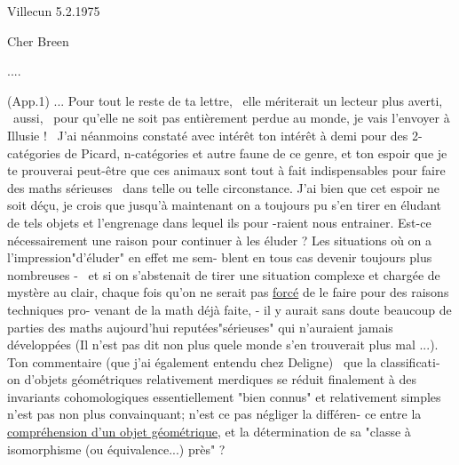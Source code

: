 
\hfill Villecun 5.2.1975

\margin{--} Cher Breen

\quad ....

(App.1) \quad ... Pour tout le reste de ta lettre, \ elle mériterait un lecteur
\margin{--} plus averti, \ aussi, \ pour qu'elle ne soit pas entièrement perdue au monde,
je vais l'envoyer à Illusie ! \ J'ai néanmoins
constaté\hand{,} avec intérêt\hand{,} ton intérêt à demi  pour des 2-catégories de
Picard, n-catégories et autre faune de ce genre, et ton espoir que je te
prouverai peut-être que ces animaux sont tout à fait indispensables pour
faire des maths sérieuses \ dans telle ou telle circonstance. J'ai bien 
que cet espoir ne soit déçu, je crois que jusqu'à maintenant on a toujours
pu s'en tirer en éludant de tels objets et l'engrenage dans lequel ils pour
-raient nous entrainer. Est-ce nécessairement une raison pour continuer à
les éluder ? Les situations où on a l'impression"d'éluder" en effet me sem-%
blent en tous cas devenir toujours plus nombreuses - \ et si on s'abstenait
de tirer une situation complexe et chargée de mystère au clair, chaque
fois qu'on ne serait pas \uline{forcé} de le faire pour des raisons techniques pro-%
venant de la math déjà faite, - il y aurait sans doute beaucoup de parties
des maths aujourd'hui reputées\hand{|}"sérieuses" qui n'auraient jamais  développées
(Il n'est pas dit non plus que\hand{|}le monde s'en trouverait plus mal ...). Ton
commentaire (que j'ai également entendu chez Deligne) \ que la classificati-%
on d'objets géométriques relativement merdiques se réduit finalement à des
invariants cohomologiques essentiellement "bien connus" et relativement
simples n'est pas non plus convainquant; n'est ce pas négliger la différen-%
ce entre la \uline{compréhension d'un objet géométrique}, et la détermination de
sa "classe à isomorphisme (ou équivalence...) près" ?

